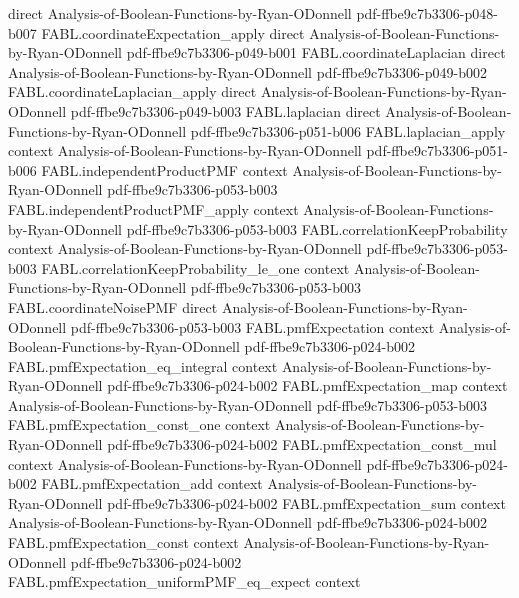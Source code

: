 \begin{theorem}
  {direct}
  {Analysis-of-Boolean-Functions-by-Ryan-ODonnell}
  {pdf-ffbe9c7b3306-p048-b007}
\proofstep
  {FABL.coordinateExpectation_apply}
  {direct}
  {Analysis-of-Boolean-Functions-by-Ryan-ODonnell}
  {pdf-ffbe9c7b3306-p049-b001}
\proofstep
  {FABL.coordinateLaplacian}
  {direct}
  {Analysis-of-Boolean-Functions-by-Ryan-ODonnell}
  {pdf-ffbe9c7b3306-p049-b002}
\proofstep
  {FABL.coordinateLaplacian_apply}
  {direct}
  {Analysis-of-Boolean-Functions-by-Ryan-ODonnell}
  {pdf-ffbe9c7b3306-p049-b003}
\proofstep
  {FABL.laplacian}
  {direct}
  {Analysis-of-Boolean-Functions-by-Ryan-ODonnell}
  {pdf-ffbe9c7b3306-p051-b006}
\proofstep
  {FABL.laplacian_apply}
  {context}
  {Analysis-of-Boolean-Functions-by-Ryan-ODonnell}
  {pdf-ffbe9c7b3306-p051-b006}
\proofstep
  {FABL.independentProductPMF}
  {context}
  {Analysis-of-Boolean-Functions-by-Ryan-ODonnell}
  {pdf-ffbe9c7b3306-p053-b003}
\proofstep
  {FABL.independentProductPMF_apply}
  {context}
  {Analysis-of-Boolean-Functions-by-Ryan-ODonnell}
  {pdf-ffbe9c7b3306-p053-b003}
\proofstep
  {FABL.correlationKeepProbability}
  {context}
  {Analysis-of-Boolean-Functions-by-Ryan-ODonnell}
  {pdf-ffbe9c7b3306-p053-b003}
\proofstep
  {FABL.correlationKeepProbability_le_one}
  {context}
  {Analysis-of-Boolean-Functions-by-Ryan-ODonnell}
  {pdf-ffbe9c7b3306-p053-b003}
\proofstep
  {FABL.coordinateNoisePMF}
  {direct}
  {Analysis-of-Boolean-Functions-by-Ryan-ODonnell}
  {pdf-ffbe9c7b3306-p053-b003}
\proofstep
  {FABL.pmfExpectation}
  {context}
  {Analysis-of-Boolean-Functions-by-Ryan-ODonnell}
  {pdf-ffbe9c7b3306-p024-b002}
\proofstep
  {FABL.pmfExpectation_eq_integral}
  {context}
  {Analysis-of-Boolean-Functions-by-Ryan-ODonnell}
  {pdf-ffbe9c7b3306-p024-b002}
\proofstep
  {FABL.pmfExpectation_map}
  {context}
  {Analysis-of-Boolean-Functions-by-Ryan-ODonnell}
  {pdf-ffbe9c7b3306-p053-b003}
\proofstep
  {FABL.pmfExpectation_const_one}
  {context}
  {Analysis-of-Boolean-Functions-by-Ryan-ODonnell}
  {pdf-ffbe9c7b3306-p024-b002}
\proofstep
  {FABL.pmfExpectation_const_mul}
  {context}
  {Analysis-of-Boolean-Functions-by-Ryan-ODonnell}
  {pdf-ffbe9c7b3306-p024-b002}
\proofstep
  {FABL.pmfExpectation_add}
  {context}
  {Analysis-of-Boolean-Functions-by-Ryan-ODonnell}
  {pdf-ffbe9c7b3306-p024-b002}
\proofstep
  {FABL.pmfExpectation_sum}
  {context}
  {Analysis-of-Boolean-Functions-by-Ryan-ODonnell}
  {pdf-ffbe9c7b3306-p024-b002}
\proofstep
  {FABL.pmfExpectation_const}
  {context}
  {Analysis-of-Boolean-Functions-by-Ryan-ODonnell}
  {pdf-ffbe9c7b3306-p024-b002}
\proofstep
  {FABL.pmfExpectation_uniformPMF_eq_expect}
  {context}

\end{theorem}
